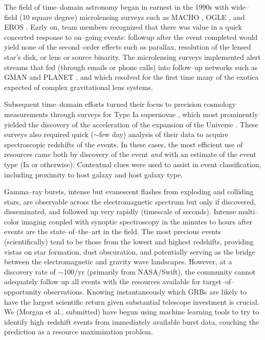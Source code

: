 \smallskip

The field of time--domain astronomy began in earnest in the 1990s with
wide--field (10 square degree) microlensing surveys such as MACHO
\citep{2000ApJ...542..281A}, OGLE \citep{1994AcA....44..227U}, and EROS
\citep{2003A&A...400..951A}.   Early on, team members recognized that there was
value in a quick concerted response to on--going events: followup after the
event completed would yield none of the second--order effects such as parallax,
resolution of the lensed star's disk, or lens or source binarity.  The
microlensing surveys implemented alert streams that fed (through emails or phone
calls) into follow--up networks such as GMAN \citep{2000PhDT.......258B} and
PLANET \citep{1998ApJ...509..687A}, and which resolved for the first time many
of the exotica expected of complex gravitational lens systems.

Subsequent time--domain efforts turned their focus to precision cosmology
measurements through surveys for Type Ia supernovae \citep{1996AJ....112.2398H},
which most prominently yielded the discovery of the acceleration of the
expansion of the Universe \citep{1998AJ....116.1009R,1999ApJ...517..565P}. These
surveys also required quick ($\sim$few day) analysis of their data to acquire
spectroscopic redshifts of the events. In these cases, the most efficient use of
resources came both by discovery of the event {\it and} with an estimate of the
event type (Ia or otherwise).  Contextual clues were used to assist in event
classification, including proximity to host galaxy and host galaxy type.

Gamma--ray bursts, intense but evanescent flashes from exploding and colliding
stars, are observable across the electromagnetic spectrum but only if
discovered, disseminated, and followed up very rapidly (timescale of seconds).
Intense multi--color imaging coupled with synoptic spectroscopy in the minutes
to hours after events are the state--of--the--art in the field. The most
precious events (scientifically) tend to be those from the lowest and highest
redshifts, providing vistas on star formation, dust obscuration, and potentially
serving as the bridge between the electromagnetic and gravity wave landscapes.
However, at a discovery rate of $\sim$100/yr (primarily from NASA/Swift), the
community cannot adequately follow up all events with the resources available
for target--of--opportunity observations. Knowing instantaneously which GRBs are
likely to have the largest scientific return given substantial telescope
investment is crucial. We (Morgan et al., submitted) have begun using machine
learning tools to try to identify high--redshift events from immediately
available burst data, couching the prediction as a resource maximization
problem.

